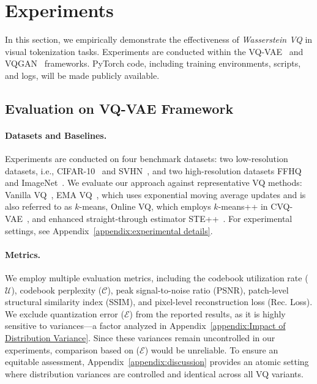 \section{Experiments}\label{sec:experiments}

In this section, we empirically demonstrate the effectiveness of \emph{Wasserstein VQ} in visual tokenization tasks. Experiments are conducted within the VQ-VAE~\citep{Oord2017NeuralDR} and VQGAN~\citep{Esser2020TamingTF} frameworks. PyTorch code, including training environments, scripts, and logs, will be made publicly available.

\subsection{Evaluation on VQ-VAE Framework}
\label{sec:vqvae experiments}
\paragraph{Datasets and Baselines.} Experiments are conducted on four benchmark datasets: two low-resolution datasets, i.e., CIFAR-10~\citep{Krizhevsky2009LearningML} and SVHN~\citep{Netzer2011ReadingDI},  and two high-resolution datasets FFHQ~\citep{Karras2018ASG} and ImageNet~\citep{Deng2009ImageNetAL}. We evaluate our approach against representative VQ methods:  Vanilla VQ~\citep{Oord2017NeuralDR}, EMA VQ~\citep{Razavi2019GeneratingDH}, which uses exponential moving average updates and is also referred to as $k$-means, Online VQ, which employs $k$-means++ in CVQ-VAE~\citep{Zheng2023OnlineCC}, and enhanced  straight-through estimator STE++~\citep{Huh2023StraighteningOT}. For experimental settings, see Appendix~\ref{appendix:experimental details}. 
\vspace{-2ex}

\paragraph{Metrics.}
We employ multiple evaluation metrics, including the codebook utilization rate ($\mathcal{U}$), codebook perplexity ($\mathcal{C}$), peak signal-to-noise ratio (PSNR), patch-level structural similarity index (SSIM), and pixel-level reconstruction loss (Rec. Loss). We exclude quantization error ($\mathcal{E}$) from the reported results, as it is highly sensitive to variances—a factor analyzed in Appendix~\ref{appendix:Impact of Distribution Variance}. Since these variances remain uncontrolled in our experiments, comparison based on 
($\mathcal{E}$) would be unreliable. To ensure an equitable assessment, Appendix~\ref{appendix:discussion} provides an atomic setting where distribution variances are controlled and identical across all VQ variants.
\vspace{-2ex}

